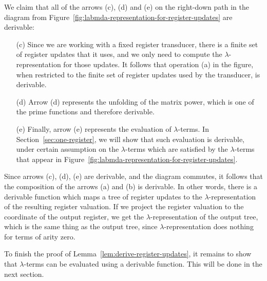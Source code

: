 


We claim that all of the arrows (c), (d) and (e) on the  right-down path  in the diagram from Figure~\ref{fig:labmda-representation-for-register-updates}   are derivable:
\begin{itemize}
    \item[(c)] Since we are working with a fixed register transducer, there is a finite set of register updates that it uses, and we only need to compute the $\lambda$-representation for those updates. It follows that operation (a) in the figure, when restricted to the finite set of register updates used by the transducer, is derivable.
    \item[(d)] Arrow (d) represents the unfolding of the matrix power, which is one of the prime functions and therefore derivable. 
    \item[(e)] Finally, arrow (e) represents the evaluation of $\lambda$-terms. In Section~\ref{sec:one-register}, we will  show that such evaluation is derivable, under certain assumption on the $\lambda$-terms which are satisfied by the $\lambda$-terms that appear in Figure~\ref{fig:labmda-representation-for-register-updates}.
\end{itemize}
Since arrows (c), (d), (e) are derivable, and the diagram commutes, it follows that  the composition of the arrows (a) and (b) is derivable. In other words, there is a derivable function which maps a tree of register updates to the $\lambda$-representation of the resulting register valuation. If we project the register valuation to the coordinate of the output register, we get the $\lambda$-representation of the output tree, which is the same thing as the output tree, since $\lambda$-representation does nothing for terms of arity zero. 

To finish the proof of Lemma~\ref{lem:derive-register-updates}, it remains to show that $\lambda$-terms can be evaluated using a derivable function.  This will be done in the next section. 





